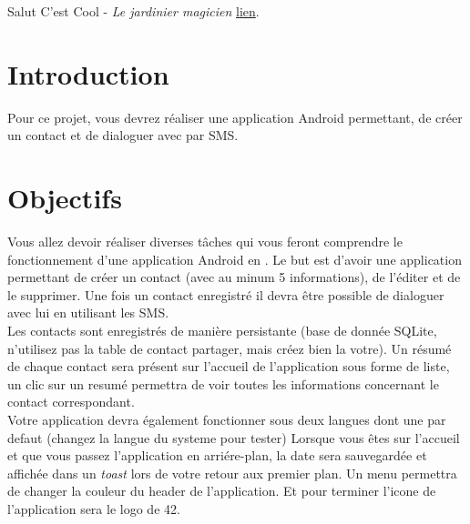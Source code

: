 \documentclass{42}
\begin{document}
	Salut C'est Cool - \textit{Le jardinier magicien}
	\href{https://www.youtube.com/watch?v=CoCyOX59bhI}{lien}.

\chapter{Introduction}

	Pour ce projet, vous devrez r\'ealiser une application Android permettant,
	de cr\'eer un contact et de dialoguer avec par SMS.

\chapter{Objectifs}

	Vous allez devoir r\'ealiser diverses t\^aches qui vous feront comprendre le
	fonctionnement d'une application Android en \@JAVA.
	Le but est d'avoir une application permettant de cr\'eer un contact (avec au minum 5 informations),
	de l'\'editer et de le supprimer. Une fois un contact enregistr\'e il devra
	\^etre possible de dialoguer avec lui en utilisant les SMS.\\
	
	\vspace{5mm}
	Les contacts sont enregistr\'es de mani\`ere persistante (base de donn\'ee 
	SQLite, n'utilisez pas la table de contact partager, mais cr\'eez bien la votre).
	Un r\'esum\'e de chaque contact sera pr\'esent sur l'accueil de l'application
	sous forme de liste, un clic sur un resum\'e permettra de voir toutes les
	informations concernant le contact correspondant.\\

	\vspace{5mm}
	Votre application devra \'egalement fonctionner sous deux langues dont une par defaut
	(changez la langue du systeme pour tester) Lorsque vous \^etes
	sur l'accueil et que vous passez l'application en arri\'ere-plan, la date
	sera sauvegard\'ee et affich\'ee dans un \textit{toast} lors de votre
	retour aux premier plan. Un menu permettra de changer la couleur du header
	de l'application. Et pour terminer l'icone de l'application sera le logo de
	42.
\end{document}
